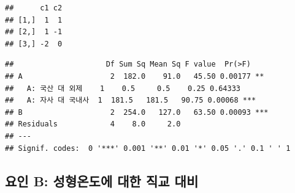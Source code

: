 \documentclass[
]{book}
\newenvironment{Shaded}{\begin{snugshade}}{\end{snugshade}}
\newcommand{\AttributeTok}[1]{\textcolor[rgb]{0.77,0.63,0.00}{#1}}
\newcommand{\CommentTok}[1]{\textcolor[rgb]{0.56,0.35,0.01}{\textit{#1}}}
\newcommand{\DecValTok}[1]{\textcolor[rgb]{0.00,0.00,0.81}{#1}}
\newcommand{\FunctionTok}[1]{\textcolor[rgb]{0.00,0.00,0.00}{#1}}
\newcommand{\NormalTok}[1]{#1}
\newcommand{\OtherTok}[1]{\textcolor[rgb]{0.56,0.35,0.01}{#1}}
\newcommand{\SpecialCharTok}[1]{\textcolor[rgb]{0.00,0.00,0.00}{#1}}
\newcommand{\StringTok}[1]{\textcolor[rgb]{0.31,0.60,0.02}{#1}}
\begin{document}
\begin{verbatim}
##      c1 c2
## [1,]  1  1
## [2,]  1 -1
## [3,] -2  0
\end{verbatim}

\begin{Shaded}
\end{Shaded}

\begin{verbatim}
##                     Df Sum Sq Mean Sq F value  Pr(>F)    
## A                    2  182.0    91.0   45.50 0.00177 ** 
##   A: 국산 대 외제    1    0.5     0.5    0.25 0.64333    
##   A: 자사 대 국내사  1  181.5   181.5   90.75 0.00068 ***
## B                    2  254.0   127.0   63.50 0.00093 ***
## Residuals            4    8.0     2.0                    
## ---
## Signif. codes:  0 '***' 0.001 '**' 0.01 '*' 0.05 '.' 0.1 ' ' 1
\end{verbatim}

\hypertarget{uxc694uxc778-b-uxc131uxd615uxc628uxb3c4uxc5d0-uxb300uxd55c-uxc9c1uxad50-uxb300uxbe44}{%
\subsection{요인 B: 성형온도에 대한 직교 대비}\label{uxc694uxc778-b-uxc131uxd615uxc628uxb3c4uxc5d0-uxb300uxd55c-uxc9c1uxad50-uxb300uxbe44}}

\begin{Shaded}
\end{Shaded}
\end{document}
